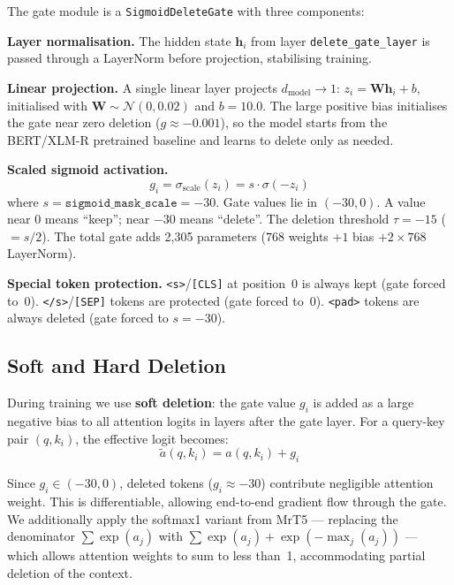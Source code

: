 \documentclass[11pt,a4paper]{article}
\begin{document}
The gate module is a \texttt{SigmoidDeleteGate} with three components:

\textbf{Layer normalisation.} The hidden state $\mathbf{h}_i$ from layer \texttt{delete\_gate\_layer} is passed through a LayerNorm before projection, stabilising training.

\textbf{Linear projection.} A single linear layer projects $d_{\text{model}} \rightarrow 1$: $z_i = \mathbf{W}\mathbf{h}_i + b$, initialised with $\mathbf{W} \sim \mathcal{N}(0, 0.02)$ and $b = 10.0$. The large positive bias initialises the gate near zero deletion ($g \approx -0.001$), so the model starts from the BERT/XLM-R pretrained baseline and learns to delete only as needed.

\textbf{Scaled sigmoid activation.}
\begin{equation}
    g_i = \sigma_{\text{scale}}(z_i) = s \cdot \sigma(-z_i)
    \label{eq:scaled-sigmoid}
\end{equation}
where $s = \texttt{sigmoid\_mask\_scale} = -30$. Gate values lie in $(-30, 0)$. A value near $0$ means ``keep''; near $-30$ means ``delete''. The deletion threshold $\tau = -15$ ($= s / 2$). The total gate adds 2,305 parameters ($768$ weights $+ 1$ bias $+ 2 \times 768$ LayerNorm).

\textbf{Special token protection.} \texttt{<s>}/\texttt{[CLS]} at position~0 is always kept (gate forced to~0). \texttt{</s>}/\texttt{[SEP]} tokens are protected (gate forced to~0). \texttt{<pad>} tokens are always deleted (gate forced to $s = -30$).


\subsection{Soft and Hard Deletion}
\label{sec:soft-hard-deletion}

During training we use \textbf{soft deletion}: the gate value $g_i$ is added as a large negative bias to all attention logits in layers after the gate layer. For a query-key pair $(q, k_i)$, the effective logit becomes:
\begin{equation}
    \tilde{a}(q, k_i) = a(q, k_i) + g_i
    \label{eq:soft-deletion}
\end{equation}

Since $g_i \in (-30, 0)$, deleted tokens ($g_i \approx -30$) contribute negligible attention weight. This is differentiable, allowing end-to-end gradient flow through the gate. We additionally apply the softmax1 variant from MrT5 --- replacing the denominator $\sum \exp(a_j)$ with $\sum \exp(a_j) + \exp(-\max_j(a_j))$ --- which allows attention weights to sum to less than~1, accommodating partial deletion of the context.
\end{document}
